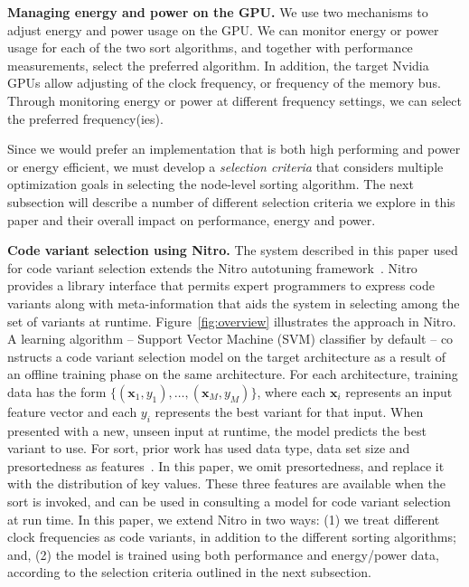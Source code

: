 \vspace*{.1in}

\noindent
{\bf Managing energy and power on the GPU.} 
We use two mechanisms to adjust energy and power usage on the GPU.  
We can monitor energy or power usage for each of the two 
sort algorithms, and together with performance measurements,
select the preferred algorithm.  In addition, the target Nvidia GPUs
allow adjusting of the clock frequency, or frequency of the memory
bus.  Through monitoring energy or power at different frequency
settings, we can select the preferred frequency(ies).  

Since we would prefer an implementation that is both high performing and
power or energy efficient, we must develop a \emph{selection 
criteria} that considers multiple optimization goals in selecting the
node-level sorting algorithm.
The next subsection will describe
a number of different selection criteria we explore in this paper
and their overall impact on performance, energy and power.

\vspace*{.1in}

\noindent
{\bf Code variant selection using Nitro.}
The system described in this paper used for code variant
selection extends
the Nitro autotuning framework~\cite{muralidharan:2014}.
Nitro provides a library interface that permits expert programmers to
express code variants along with meta-information that aids
the system in selecting among the set of variants at runtime.
Figure~\ref{fig:overview} illustrates the approach in Nitro.  
A learning algorithm -- Support Vector Machine (SVM) classifier by default -- co
nstructs a 
code variant selection
model on the target architecture as a result of an offline training phase on the
 same architecture.
For each architecture, training data has the form
$\{(\mathbf{x}_1, y_1), \hdots, (\mathbf{x}_M, y_M)\}$, where
each $\mathbf{x}_i$ represents an input feature vector and each
$y_i$ represents the best variant for that input.
When presented with a new, unseen input at runtime, the model
predicts the best variant to use. 
For sort, prior work has used data type, data set size and presortedness
as features~\cite{muralidharan:2014}.  In this paper,
we omit presortedness, and replace it with the distribution
of key values.  These three features are available when the
sort is invoked, and can be used in consulting a model for code
variant selection at run time.
In this paper, we extend Nitro in two ways: (1) we treat 
different clock frequencies as code variants, in addition to the
different sorting algorithms; and, (2) the model is trained
using both performance and energy/power data, according to the 
selection criteria outlined in the next subsection.

